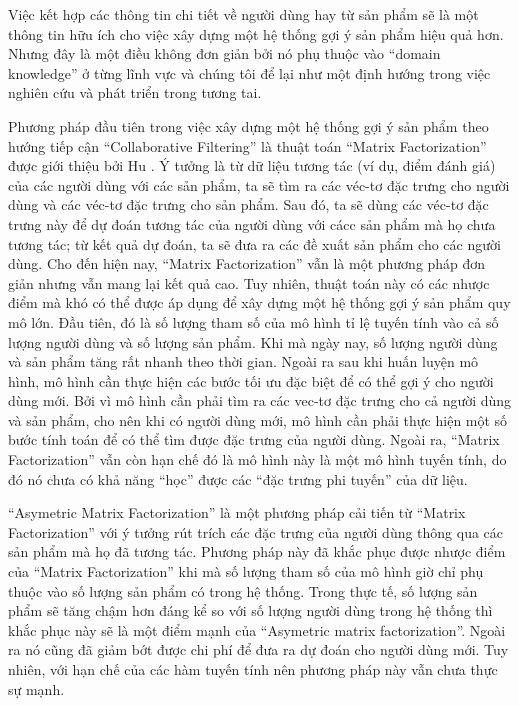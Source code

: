 Việc kết hợp các thông tin chi tiết về người dùng hay từ sản phẩm sẽ là một thông tin hữu ích cho việc xây dựng
một hệ thống gợi ý sản phẩm hiệu quả hơn. Nhưng đây là một điều không đơn giản bởi nó phụ thuộc vào ``domain knowledge'' ở từng lĩnh vực và chúng tôi để lại như một định hướng trong việc nghiên cứu và phát triển trong tương tai.

Phương pháp đầu tiên trong việc xây dựng một hệ thống gợi ý sản phẩm theo hướng tiếp cận ``Collaborative Filtering'' là thuật toán ``Matrix Factorization'' được giới thiệu bởi Hu \cite{MF}. 
Ý tưởng là từ dữ liệu tương tác (ví dụ, điểm đánh giá) của các người dùng với các sản phẩm, ta sẽ tìm ra các véc-tơ đặc trưng cho người dùng và các véc-tơ đặc trưng cho sản phẩm. 
Sau đó, ta sẽ dùng các véc-tơ đặc trưng này để dự đoán tương tác của người dùng với  cácc sản phẩm mà họ chưa tương tác; từ kết quả dự đoán, ta sẽ đưa ra các đề xuất sản phẩm cho các người dùng.
Cho đến hiện nay, ``Matrix Factorization'' vẫn  là một phương pháp đơn giản nhưng vẫn mang lại kết quả cao.
Tuy nhiên, thuật toán này có các nhược điểm mà khó có thể được áp dụng để xây dựng một hệ thống gợi ý sản phẩm quy mô lớn.
Đầu tiên, đó là số lượng tham số của mô hình tỉ lệ tuyến tính vào cả số lượng người dùng và số lượng sản phẩm.
Khi mà ngày nay, số lượng người dùng và sản phẩm tăng rất nhanh theo thời gian.
Ngoài ra sau khi huấn luyện mô hình, mô hình cần thực hiện các bước tối ưu đặc biệt để có thể gợi ý cho người dùng mới. 
Bởi vì mô hình cần phải tìm ra các vec-tơ đặc trưng cho cả người dùng và sản phẩm, cho nên khi có người dùng mới, mô hình cần phải thực hiện một số bước tính toán để có thể tìm được đặc trưng của người dùng.
Ngoài ra, ``Matrix Factorization'' vẫn còn hạn chế đó là mô hình này là một mô hình tuyến tính, do đó nó chưa có khả năng ``học'' được các ``đặc trưng phi tuyến'' của dữ liệu.

``Asymetric Matrix Factorization'' là một phương pháp cải tiến từ ``Matrix Factorization'' với ý tưởng rút trích các đặc trưng của người dùng thông qua các sản phẩm mà họ đã tương tác. 
Phương pháp này đã khắc phục được nhược điểm của ``Matrix Factorization'' khi mà số lượng tham số của mô hình giờ chỉ phụ thuộc vào số lượng sản phẩm có trong hệ thống. 
Trong thực tế, số lượng sản phẩm sẽ tăng chậm hơn đáng kể so với số lượng người dùng trong hệ thống thì khắc phục này sẽ là một điểm mạnh của ``Asymetric matrix factorization''. 
Ngoài ra nó cũng đã giảm bớt được chi phí để đưa ra dự đoán cho người dùng mới. 
Tuy nhiên, với hạn chế của các hàm tuyến tính nên phương pháp này vẫn chưa thực sự mạnh.

